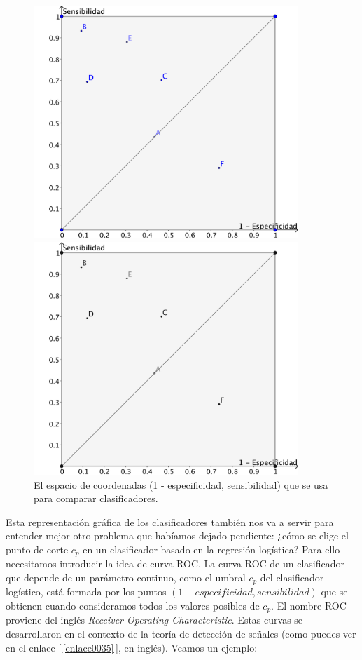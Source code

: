 \begin{figure}[htb]
\begin{center}
\begin{enColor}
\includegraphics[width=10cm]{../fig/Cap13-RegionCurvasROC.png}
\end{enColor}
\begin{bn}
\includegraphics[width=10cm]{../fig/Cap13-RegionCurvasROC-bn.png}
\end{bn}
\caption{El espacio de coordenadas (1 - especificidad, sensibilidad) que se usa para comparar clasificadores. }
\label{cap13:fig:RegionCurvasROC}
\end{center}
\end{figure}

Esta representación gráfica de los clasificadores también nos va a servir para entender mejor otro problema que habíamos dejado pendiente: ¿cómo se elige el punto de corte $c_p$ en un clasificador basado en la regresión logística? Para ello necesitamos introducir la idea de {\sf curva ROC}. La curva ROC de un clasificador que depende de un parámetro continuo, como el umbral $c_p$ del clasificador logístico, está formada por los puntos $(1 - especificidad, sensibilidad)$ que se obtienen cuando consideramos todos los valores posibles de $c_p$. El nombre ROC proviene del inglés \emph{Receiver Operating Characteristic}. Estas curvas se desarrollaron en el contexto de la teor\'ia de detección de señales (como puedes ver en el enlace [\,\ref{enlace0035}\,]\label{enlace0035a}, en inglés). Veamos un ejemplo:

